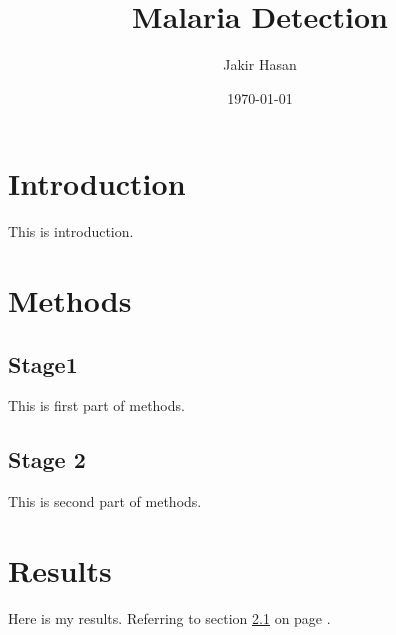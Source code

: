 \documentclass [a4paper, 12pt] {article}
\begin{document}
\title {Malaria Detection}
\author {Jakir Hasan}
\date {\today}
\maketitle

\tableofcontents
\newpage
{}

\section{Introduction}
This is introduction.

\section {Methods}

\subsection {Stage1}
\label {sec1}
This is first part of methods.

\subsection {Stage 2}
This is second part of methods.

\section {Results}
Here is my results. Referring to section \ref{sec1} on page \pageref{sec1}.
\end{document}

